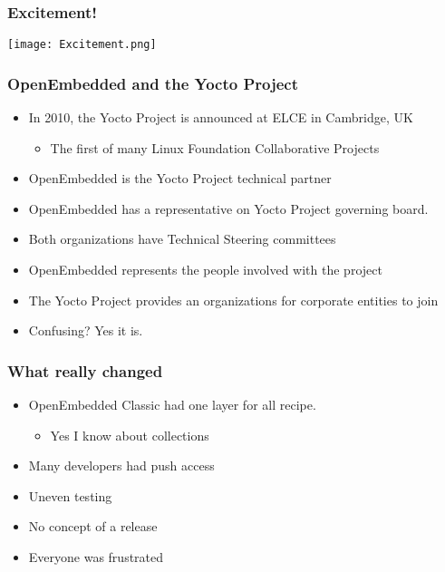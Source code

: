 \documentclass{beamer}
\begin{document}
\begin{frame}
	\frametitle{Excitement!}

\begin{center}
\texttt{[image: Excitement.png]}
\end{center}

\end{frame}
\begin{frame}

	\frametitle{OpenEmbedded and the Yocto Project}

\begin{itemize}
\item In 2010, the Yocto Project is announced at ELCE in Cambridge, UK
\begin{itemize}
	\item The first of many Linux Foundation Collaborative Projects
\end{itemize}
\item OpenEmbedded is the Yocto Project technical partner
\item OpenEmbedded has a representative on Yocto Project governing board.
\item Both organizations have Technical Steering committees
\item OpenEmbedded represents the people involved with the project
\item The Yocto Project provides an organizations for corporate entities to join
\item Confusing? Yes it is.
\end{itemize}

\end{frame}

\begin{frame}
\frametitle{What really changed}

\begin{itemize}
	\item OpenEmbedded Classic had one layer for all recipe.
		\begin{itemize}
			\item Yes I know about collections
		\end{itemize}
	\item Many developers had push access
	\item Uneven testing
	\item No concept of a release
	\item Everyone was frustrated
\end{itemize}

\end{frame}
\end{document}
